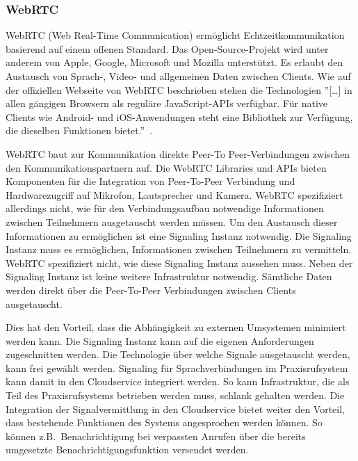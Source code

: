 \subsubsection{WebRTC}

WebRTC (Web Real-Time Communication) ermöglicht Echtzeitkommunikation basierend auf einem offenen Standard.
Das Open-Source-Projekt wird unter anderem von Apple, Google, Microsoft und Mozilla unterstützt.
Es erlaubt den Austausch von Sprach-, Video- und allgemeinen Daten zwischen Clients.
Wie auf der offiziellen Webseite von WebRTC beschrieben stehen die Technologien
''[\ldots] in allen gängigen Browsern als reguläre JavaScript-APIs verfügbar.
Für native Clients wie Android- und iOS-Anwendungen steht eine Bibliothek zur Verfügung, die dieselben Funktionen bietet.''~\cite{webrtc}.

WebRTC baut zur Kommunikation direkte Peer-To Peer-Verbindungen zwischen den Kommunikationspartnern auf.
Die WebRTC Libraries und APIs bieten Komponenten für die Integration von Peer-To-Peer Verbindung und Hardwarezugriff auf Mikrofon, Lautsprecher und Kamera.
WebRTC spezifiziert allerdings nicht, wie für den Verbindungsaufbau notwendige Informationen zwischen Teilnehmern ausgetauscht werden müssen.
Um den Austausch dieser Informationen zu ermöglichen ist eine Signaling Instanz notwendig.
Die Signaling Instanz muss es ermöglichen, Informationen zwischen Teilnehmern zu vermitteln.
WebRTC spezifiziert nicht, wie diese Signaling Instanz aussehen muss.
Neben der Signaling Instanz ist keine weitere Infrastruktur notwendig.
Sämtliche Daten werden direkt über die Peer-To-Peer Verbindungen zwischen Clients ausgetauscht.

Dies hat den Vorteil, dass die Abhängigkeit zu externen Umsystemen minimiert werden kann.
Die Signaling Instanz kann auf die eigenen Anforderungen zugeschnitten werden.
Die Technologie über welche Signale ausgetauscht werden, kann frei gewählt werden.
Signaling für Sprachverbindungen im Praxisrufsystem kann damit in den Cloudservice integriert werden.
So kann Infrastruktur, die als Teil des Praxisrufsystems betrieben werden muss, schlank gehalten werden.
Die Integration der Signalvermittlung in den Cloudservice bietet weiter den Vorteil, dass bestehende Funktionen des Systems angesprochen werden können.
So können z.B.\ Benachrichtigung bei verpassten Anrufen über die bereits umgesetzte Benachrichtigungsfunktion versendet werden.

